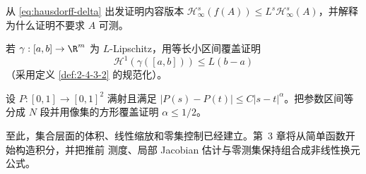 \begin{exercise}[Hausdorff 畸变]\label{exercise:2-4-3-2}
从 \eqref{eq:hausdorff-delta} 出发证明内容版本
$\mathcal H^s_\infty(f(A))\le L^s\mathcal H^s_\infty(A)$，并解释为什么证明不要求 $A$ 可测。
\end{exercise}

\begin{exercise}\label{exercise:2-4-3-3}
若 $\gamma:[a,b]\to\R^m$ 为 $L$-Lipschitz，用等长小区间覆盖证明
\[
 \mathcal H^1(\gamma([a,b]))\le L(b-a)
\]
（采用定义 \ref{def:2-4-3-2} 的规范化）。
\end{exercise}

\begin{exercise}\label{exercise:2-4-3-4}
设 $P:[0,1]\to[0,1]^2$ 满射且满足
$|P(s)-P(t)|\le C|s-t|^\alpha$。把参数区间等分成 $N$ 段并用像集的方形覆盖证明
$\alpha\le1/2$。
\end{exercise}

至此，集合层面的体积、线性缩放和零集控制已经建立。第~3 章将从简单函数开始构造积分，并把推前
测度、局部 Jacobian 估计与零测集保持组合成非线性换元公式。
